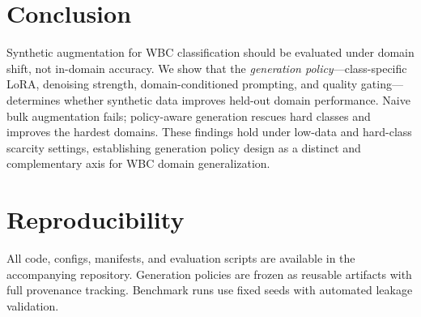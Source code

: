 \documentclass[10pt,twocolumn]{article}
\begin{document}
\section{Conclusion}
\label{sec:conclusion}

Synthetic augmentation for WBC classification should be evaluated under
domain shift, not in-domain accuracy. We show that the
\emph{generation policy}---class-specific LoRA, denoising strength,
domain-conditioned prompting, and quality gating---determines whether
synthetic data improves held-out domain performance. Naive bulk
augmentation fails; policy-aware generation rescues hard classes and
improves the hardest domains. These findings hold under low-data and
hard-class scarcity settings, establishing generation policy design as a
distinct and complementary axis for WBC domain generalization.

\section*{Reproducibility}

All code, configs, manifests, and evaluation scripts are available in the
accompanying repository. Generation policies are frozen as reusable
artifacts with full provenance tracking. Benchmark runs use fixed seeds
with automated leakage validation.



\end{document}
